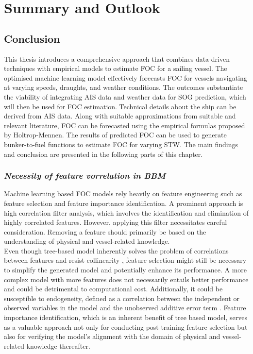 \chapter{Summary and Outlook} \label{chp:outlook}

\section{Conclusion}\label{sec:conclusion}

This thesis introduces a comprehensive approach that combines data-driven techniques with empirical models to estimate FOC for a sailing vessel. The optimised machine learning model effectively forecasts FOC for vessels navigating at varying speeds, draughts, and weather conditions. The outcomes substantiate the viability of integrating AIS data and weather data for SOG prediction, which will then be used for FOC estimation. Technical details about the ship can be derived from AIS data. Along with suitable approximations from suitable and relevant literature, FOC can be forecasted using the empirical formulas proposed by Holtrop-Mennen. The results of predicted FOC can be used to generate bunker-to-fuel functions to estimate FOC for varying STW. The main findings and conclusion are presented in the following parts of this chapter.\\

\subsection*{\emph{Necessity of feature vorrelation in BBM}}

Machine learning based FOC models rely heavily on feature engineering such as feature selection and feature importance identification. A prominent approach is high correlation filter analysis, which involves the identification and elimination of highly correlated features. However, applying this filter necessitates careful consideration. Removing a feature should primarily be based on the understanding of physical and vessel-related knowledge.\\

Even though tree-based model inherently solves the problem of correlations between features and resist collinearity , feature selection might still be necessary to simplify the generated model and potentially enhance its performance. A more complex model with more features does not necessarily entails better performance and could be detrimental to computational cost. Additionally, it could be susceptible to endogeneity, defined as a correlation between the independent or observed variables in the model and the unobserved additive error term . Feature importance identification, which is an inherent benefit of tree based model, serves as a valuable approach not only for conducting post-training feature selection but also for verifying the model's alignment with the domain of physical and vessel-related knowledge thereafter.\\ 

